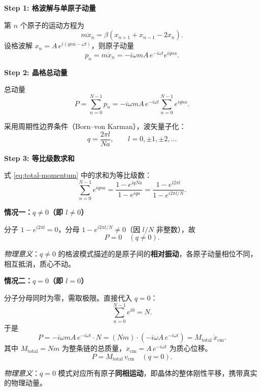 \begin{derivationbox}[标准解题过程]
\textbf{Step 1: 格波解与单原子动量}

第 $n$ 个原子的运动方程为
\begin{equation}
m\ddot x_n = \beta(x_{n+1}+x_{n-1}-2x_n).
\end{equation}
设格波解 $x_n=A\,e^{i(qna-\omega t)}$，则原子动量
\begin{equation}
p_n = m\dot x_n = -i\omega mA\,e^{-i\omega t}e^{iqna}.
\end{equation}

\textbf{Step 2: 晶格总动量}

总动量
\begin{equation}
P = \sum_{n=0}^{N-1}p_n = -i\omega mA\,e^{-i\omega t}\sum_{n=0}^{N-1}e^{iqna}.
\label{eq:total-momentum}
\end{equation}

采用周期性边界条件（Born--von Karman），波矢量子化：
\begin{equation}
q = \frac{2\pi l}{Na}, \qquad l=0,\pm1,\pm2,\dots
\end{equation}

\textbf{Step 3: 等比级数求和}

式 \eqref{eq:total-momentum} 中的求和为等比级数：
\begin{equation}
\sum_{n=0}^{N-1}e^{iqna} = \frac{1-e^{iqNa}}{1-e^{iqa}} = \frac{1-e^{i2\pi l}}{1-e^{i2\pi l/N}}.
\end{equation}

\textbf{情况一：$q\neq0$（即 $l\neq0$）}

分子 $1-e^{i2\pi l}=0$，分母 $1-e^{i2\pi l/N}\neq0$（因 $l/N$ 非整数），故
\begin{equation}
\boxed{P=0 \quad (q\neq0).}
\end{equation}

\textit{物理意义}：$q\neq0$ 的格波模式描述的是原子间的\textbf{相对振动}，各原子动量相位不同，相互抵消，质心不动。

\textbf{情况二：$q=0$（即 $l=0$）}

分子分母同时为零，需取极限。直接代入 $q=0$：
\begin{equation}
\sum_{n=0}^{N-1}e^{i0} = N.
\end{equation}
于是
\begin{equation}
P = -i\omega mA\,e^{-i\omega t}\cdot N = (Nm)\cdot(-i\omega A\,e^{-i\omega t}) = M_{\text{total}}\,\dot x_{\text{cm}}.
\end{equation}
其中 $M_{\text{total}}=Nm$ 为整条链的总质量，$x_{\text{cm}}=A\,e^{-i\omega t}$ 为质心位移。
\begin{equation}
\boxed{P = M_{\text{total}}\,v_{\text{cm}} \quad (q=0).}
\end{equation}

\textit{物理意义}：$q=0$ 模式对应所有原子\textbf{同相运动}，即晶体的整体刚性平移，携带真实的物理动量。
\end{derivationbox}

